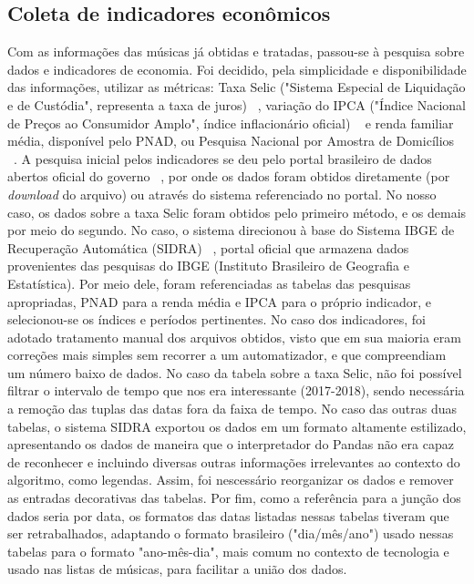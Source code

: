 \subsection{Coleta de indicadores econômicos}
\label{c.coleta_economicos}

Com as informações das músicas já obtidas e tratadas, passou-se à pesquisa sobre dados e indicadores de economia. Foi decidido, pela simplicidade e disponibilidade das informações, utilizar as métricas: Taxa Selic ("Sistema Especial de Liquidação e de Custódia", representa a taxa de juros) ~\cite{selic}, variação do IPCA ("Índice Nacional de Preços ao Consumidor Amplo", índice inflacionário oficial) ~\cite{ipca} e renda familiar média, disponível pelo PNAD, ou Pesquisa Nacional por Amostra de Domicílios ~\cite{pnad}. A pesquisa inicial pelos indicadores se deu pelo portal brasileiro de dados abertos oficial do governo ~\cite{dadosgov}, por onde os dados foram obtidos diretamente (por \textit{download} do arquivo) ou através do sistema referenciado no portal. No nosso caso, os dados sobre a taxa Selic foram obtidos pelo primeiro método, e os demais por meio do segundo. No caso, o sistema direcionou à base do Sistema IBGE de Recuperação Automática (SIDRA) ~\cite{sidra}, portal oficial que armazena dados provenientes das pesquisas do IBGE (Instituto Brasileiro de Geografia e Estatística). Por meio dele, foram referenciadas as tabelas das pesquisas apropriadas, PNAD para a renda média e IPCA para o próprio indicador, e selecionou-se os índices e períodos pertinentes.
No caso dos indicadores, foi adotado tratamento manual dos arquivos obtidos, visto que em sua maioria eram correções mais simples sem recorrer a um automatizador, e que compreendiam um número baixo de dados. No caso da tabela sobre a taxa Selic, não foi possível filtrar o intervalo de tempo que nos era interessante (2017-2018), sendo necessária a remoção das tuplas das datas fora da faixa de tempo. No caso das outras duas tabelas, o sistema SIDRA exportou os dados em um formato altamente estilizado, apresentando os dados de maneira que o interpretador do Pandas não era capaz de reconhecer e incluindo diversas outras informações irrelevantes ao contexto do algoritmo, como legendas. Assim, foi nescessário reorganizar os dados e remover as entradas decorativas das tabelas. Por fim, como a referência para a junção dos dados seria por data, os formatos das datas listadas nessas tabelas tiveram que ser retrabalhados, adaptando o formato brasileiro ("dia/mês/ano") usado nessas tabelas para o formato "ano-mês-dia", mais comum no contexto de tecnologia e usado nas listas de músicas, para facilitar a união dos dados.

